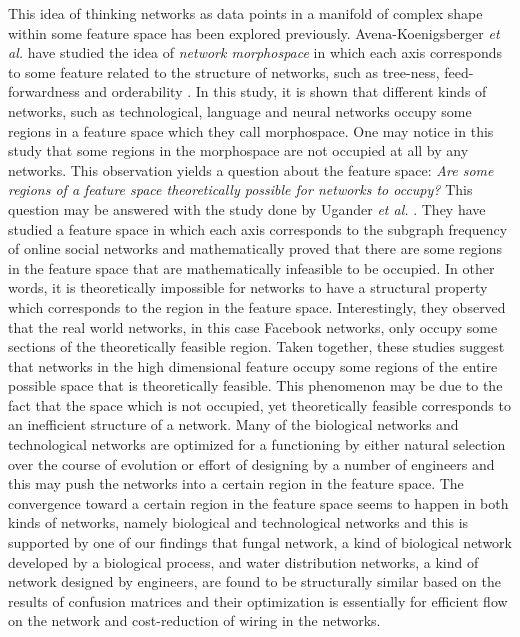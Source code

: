 \documentclass[..]{revtex4}
\begin{document}
This idea of thinking networks as data points in a manifold of complex shape within some feature space has been explored previously. Avena-Koenigsberger \textit{et al.} have studied the idea of \textit{network morphospace} in which each axis corresponds to some feature related to the structure of networks, such as tree-ness, feed-forwardness and orderability \cite{NetworkMorphospace}. In this study, it is shown that different kinds of networks, such as technological, language and neural networks occupy some regions in a feature space which they call morphospace. One may notice in this study that some regions in the morphospace are not occupied at all by any networks. This observation yields a question about the feature space: \textit{Are some regions of a feature space theoretically possible for networks to occupy?} This question may be answered with the study done by Ugander \textit{et al.} \cite{Ugander:2013}. They have studied a feature space in which each axis corresponds to the subgraph frequency of online social networks and mathematically proved that there are some regions in the feature space that are mathematically infeasible to be occupied. In other words, it is theoretically impossible for networks to have a structural property which corresponds to the region in the feature space. Interestingly, they observed that the real world networks, in this case Facebook networks, only occupy some sections of the theoretically feasible region. Taken together, these studies suggest that networks in the high dimensional feature occupy some regions of the entire possible space that is theoretically feasible. This phenomenon may be due to the fact that the space which is not occupied, yet theoretically feasible corresponds to an inefficient structure of a network. Many of the biological networks and technological networks are optimized for a functioning by either natural selection over the course of evolution or effort of designing by a number of engineers and this may push the networks into a certain region in the feature space. The convergence toward a certain region in the feature space seems to happen in both kinds of networks, namely biological and technological networks and this is supported by one of our findings that fungal network, a kind of biological network developed by a biological process, and water distribution networks, a kind of network designed by engineers, are found to be structurally similar based on the results of confusion matrices and their optimization is essentially for efficient flow on the network and cost-reduction of wiring in the networks.
 
\end{document}

